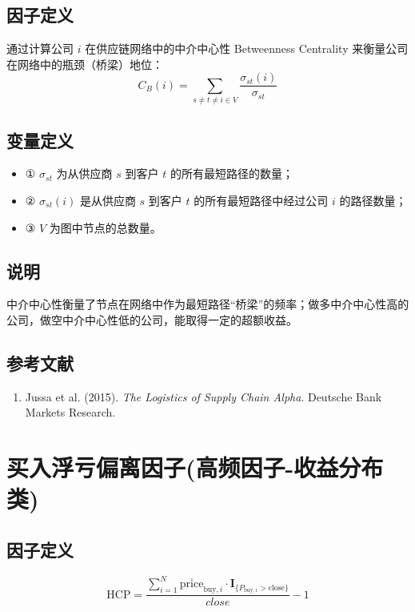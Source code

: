 \documentclass{article}
\begin{document}
\subsection{因子定义}
通过计算公司 \( i \) 在供应链网络中的中介中心性 Betweenness Centrality 来衡量公司在网络中的瓶颈（桥梁）地位：
\begin{equation}
    C_B(i) = \sum_{s \neq t \neq i \in V} \frac{\sigma_{st}(i)}{\sigma_{st}}
\end{equation}

\subsection{变量定义}
\begin{itemize}
    \item ① \( \sigma_{st} \) 为从供应商 \( s \) 到客户 \( t \) 的所有最短路径的数量；
    \item ② \( \sigma_{st}(i) \) 是从供应商 \( s \) 到客户 \( t \) 的所有最短路径中经过公司 \( i \) 的路径数量；
    \item ③ \( V \) 为图中节点的总数量。
\end{itemize}

\subsection{说明}
中介中心性衡量了节点在网络中作为最短路径“桥梁”的频率；做多中介中心性高的公司，做空中介中心性低的公司，能取得一定的超额收益。

\subsection{参考文献}
\begin{enumerate}
    \item Jussa et al. (2015). \textit{The Logistics of Supply Chain Alpha}. Deutsche Bank Markets Research.
\end{enumerate}

\section{买入浮亏偏离因子(高频因子-收益分布类)}

\subsection{因子定义}
\begin{equation}
    \mathrm{HCP} = \frac{\sum_{i=1}^{N} \overline{\mathrm{price}}_{\mathrm{buy},i} \cdot \mathbf{I}_{\{P_{\mathrm{buy},i} > \mathrm{close}\}}}{close} - 1
\end{equation}
\end{document}
